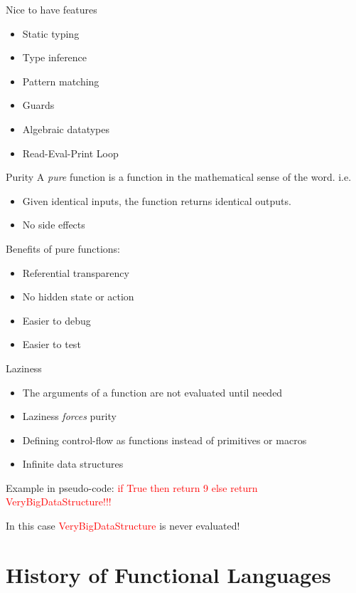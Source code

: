 \documentclass[pdf]{beamer}
\newcommand{\code}[1]{\textcolor{Red}{\textsf{#1}}}
\begin{document}
\begin{frame}{Nice to have features}
  \begin{itemize}
  \item Static typing
  \item Type inference
  \item Pattern matching
  \item Guards
  \item Algebraic datatypes
  \item Read-Eval-Print Loop
  \end{itemize}
\end{frame}

\begin{frame}{Purity}
  A \textit{pure} function is a function in the mathematical sense of the word. i.e.
  \begin{itemize}
  \item Given identical inputs, the function returns identical outputs.
  \item No side effects
  \end{itemize}

  Benefits of pure functions:
  \begin{itemize}
  \item Referential transparency
  \item No hidden state or action
  \item Easier to debug
  \item Easier to test
  \end{itemize}
\end{frame}

\begin{frame}[fragile]{Laziness}
  \begin{itemize}
  \item The arguments of a function are not evaluated until needed
  \item Laziness \textit{forces} purity
  \item Defining control-flow as functions instead of primitives or macros
  \item Infinite data structures
   \end{itemize}

  Example in pseudo-code:
  \code{if True then return 9 else return VeryBigDataStructure!!!}

  In this case \code{VeryBigDataStructure} is never evaluated!
\end{frame}

\section{History of Functional Languages}
\label{sec:history}
\end{document}
